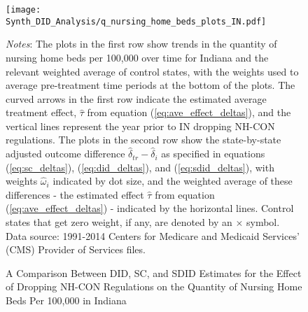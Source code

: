\documentclass[../Main.tex]{subfiles}
\begin{document}
\newpage
\begin{figure}[t] 
	\begin{center}
	\caption{\label{fig:q_nhb_plots_in} \centering A Comparison Between DID, SC, and SDID Estimates for the Effect of Dropping NH-CON Regulations on the Quantity of Nursing Home Beds Per 100,000 in Indiana}
    \texttt{[image: Synth\_DID\_Analysis/q\_nursing\_home\_beds\_plots\_IN.pdf]}
    \end{center}
    \footnotesize
		\textit{Notes}: The plots in the first row show trends in the quantity of nursing home beds per 100,000 over time for Indiana and the relevant weighted average of control states, with the weights used to average pre-treatment time periods at the bottom of the plots. The curved arrows in the first row indicate the estimated average treatment effect, $\hat{\tau}$ from equation (\ref{eq:ave_effect_deltas}), and the vertical lines represent the year prior to IN dropping NH-CON regulations. The plots in the second row show the state-by-state adjusted outcome difference $\hat{\delta}_{tr}-\hat{\delta}_i$ as specified in equations (\ref{eq:sc_deltas}), (\ref{eq:did_deltas}), and (\ref{eq:sdid_deltas}), with weights $\hat{\omega}_i$ indicated by dot size, and the weighted average of these differences - the estimated effect $\hat{\tau}$ from equation (\ref{eq:ave_effect_deltas}) - indicated by the horizontal lines. Control states that get zero weight, if any, are denoted by an $\times$ symbol. Data source: 1991-2014 Centers for Medicare and Medicaid Services’ (CMS) Provider of Services files.
\end{figure}
\clearpage
\end{document}
